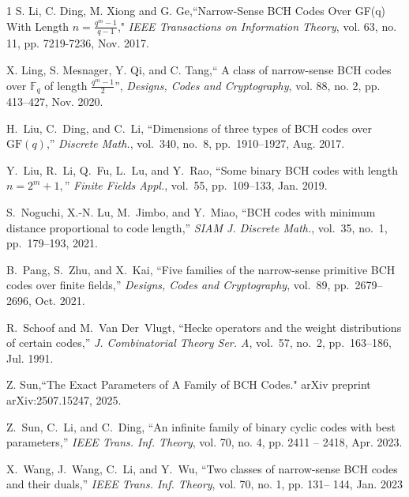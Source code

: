 \documentclass[journal,onecolumn]{IEEEtran}
\begin{document}
\begin{thebibliography}{1}
S. Li, C. Ding, M. Xiong and G. Ge,``Narrow-Sense BCH Codes Over  GF(q)  With Length  $n=\frac{q^m-1}{q-1}$," {\em IEEE Transactions on Information Theory}, vol. 63, no. 11, pp. 7219-7236, Nov. 2017. 

X. Ling, S. Mesnager, Y. Qi, and C. Tang,`` A class of narrow-sense BCH codes over $\mathbb{F}_q$ of length $\frac{q^m-1} {2}$'', {\em Designs, Codes and Cryptography}, vol. 88, no. 2, pp. 413--427, Nov. 2020.

H.~Liu, C.~Ding, and C.~Li, ``Dimensions of three types of BCH codes over $\mathrm{GF}(q)$,'' {\em Discrete Math.}, vol.~340, no.~8, pp.~1910--1927, Aug. 2017.



Y.~Liu, R.~Li, Q.~Fu, L.~Lu, and Y.~Rao, ``Some binary BCH codes with length $n=
  2^m+ 1,$'' {\em Finite Fields Appl.}, vol.~55, pp.~109--133,
  Jan. 2019.


  


  






S.~Noguchi, X.-N. Lu, M.~Jimbo, and Y.~Miao, ``BCH codes with minimum distance
  proportional to code length,'' {\em SIAM J. Discrete Math.},
  vol.~35, no.~1, pp.~179--193, 2021.


B.~Pang, S.~Zhu, and X.~Kai, ``Five families of the narrow-sense primitive BCH
  codes over finite fields,'' {\em Designs, Codes and Cryptography}, vol.~89,
  pp.~2679--2696, Oct. 2021.












R.~Schoof and M.~Van Der~Vlugt, ``Hecke operators and the weight distributions
  of certain codes,'' {\em J. Combinatorial Theory Ser. A}, vol.~57,
  no.~2, pp.~163--186, Jul. 1991.


 Z. Sun,``The Exact Parameters of A Family of BCH Codes."  arXiv preprint arXiv:2507.15247, 2025.


Z.~Sun, C.~Li, and C.~Ding, ``An infinite family of binary cyclic codes with
  best parameters,'' {\em IEEE Trans. Inf. Theory}, vol. 70, no. 4, pp. 2411 -- 2418, Apr. 2023.


X.~Wang, J.~Wang, C.~Li, and Y.~Wu, ``Two classes of narrow-sense BCH codes and
  their duals,'' {\em IEEE Trans. Inf. Theory}, vol. 70, no. 1, pp. 131-- 144, Jan. 2023



\end{thebibliography}
\end{document}
